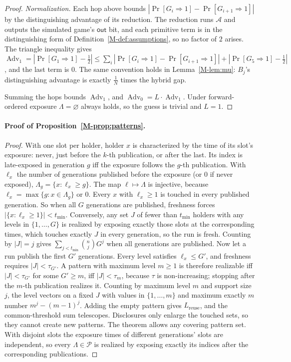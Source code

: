 \documentclass[pdflatex,sn-mathphys-num]{sn-jnl}
\theoremstyle{plain}
\newcommand{\Adv}{\operatorname{Adv}}
\begin{document}
\begin{proof}
\emph{Normalization.} Each hop above bounds $|\Pr[G_i\Rightarrow1]-\Pr[G_{i+1}\Rightarrow1]|$ by the distinguishing advantage of its reduction. The reduction runs $\mathcal A$ and outputs the simulated game's $\mathsf{out}$ bit, and each primitive term is in the distinguishing form of Definition~\ref{M-def:assumptions}, so no factor of $2$ arises. The triangle inequality gives $\Adv_1=|\Pr[G_1\Rightarrow1]-\tfrac12|\le\sum_i|\Pr[G_i\Rightarrow1]-\Pr[G_{i+1}\Rightarrow1]|+|\Pr[G_5\Rightarrow1]-\tfrac12|$, and the last term is $0$. The same convention holds in Lemma~\ref{M-lem:mu}: $B_j$'s distinguishing advantage is exactly $\tfrac1N$ times the hybrid gap.

Summing the hops bounds $\Adv_1$, and $\Adv_0=L\cdot\Adv_1$. Under forward-ordered exposure $\Lambda=\varnothing$ always holds, so the guess is trivial and $L=1$.
\end{proof}

\paragraph{Proof of Proposition~\ref{M-prop:patterns}.}
\begin{proof}
With one slot per holder, holder $x$ is characterized by the time of its slot's exposure: never, just before the $k$-th publication, or after the last. Its index is late-exposed in generation $g$ iff the exposure follows the $g$-th publication. With $\ell_x$ the number of generations published before the exposure (or $0$ if never exposed), $\Lambda_g=\{x:\ell_x\ge g\}$. The map $\ell\mapsto\Lambda$ is injective, because $\ell_x=\max\{g:x\in\Lambda_g\}$ or $0$. Every $x$ with $\ell_x\ge1$ is touched in every published generation. So when all $G$ generations are published, freshness forces $|\{x:\ell_x\ge1\}|<t_{\min}$. Conversely, any set $J$ of fewer than $t_{\min}$ holders with any levels in $\{1,\dots,G\}$ is realized by exposing exactly those slots at the corresponding times, which touches exactly $J$ in every generation, so the run is fresh. Counting by $|J|=j$ gives $\sum_{j<t_{\min}}\binom njG^j$ when all generations are published. Now let a run publish the first $G'$ generations. Every level satisfies $\ell_x\le G'$, and freshness requires $|J|<\tau_{G'}$. A pattern with maximum level $m\ge1$ is therefore realizable iff $|J|<\tau_{G'}$ for some $G'\ge m$, iff $|J|<\tau_m$, because $\tau$ is non-increasing; stopping after the $m$-th publication realizes it. Counting by maximum level $m$ and support size $j$, the level vectors on a fixed $J$ with values in $\{1,\dots,m\}$ and maximum exactly $m$ number $m^j-(m-1)^j$. Adding the empty pattern gives $L_{\mathrm{reuse}}$, and the common-threshold sum telescopes. Disclosures only enlarge the touched sets, so they cannot create new patterns. The theorem allows any covering pattern set. With disjoint slots the exposure times of different generations' slots are independent, so every $\Lambda\in\mathcal P$ is realized by exposing exactly its indices after the corresponding publications.
\end{proof}


\end{document}
